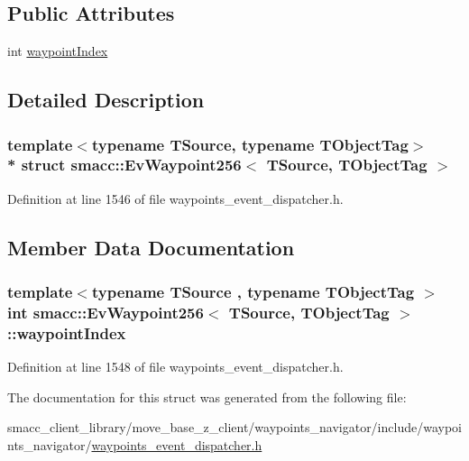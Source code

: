 \subsection*{Public Attributes}
\begin{DoxyCompactItemize}
\item 
int \hyperlink{structsmacc_1_1EvWaypoint256_a1b34ce939b7d125d504a2ea50d443607}{waypoint\+Index}
\end{DoxyCompactItemize}


\subsection{Detailed Description}
\subsubsection*{template$<$typename T\+Source, typename T\+Object\+Tag$>$\\*
struct smacc\+::\+Ev\+Waypoint256$<$ T\+Source, T\+Object\+Tag $>$}



Definition at line 1546 of file waypoints\+\_\+event\+\_\+dispatcher.\+h.



\subsection{Member Data Documentation}
\subsubsection[{\texorpdfstring{waypoint\+Index}{waypointIndex}}]{\setlength{\rightskip}{0pt plus 5cm}template$<$typename T\+Source , typename T\+Object\+Tag $>$ int {\bf smacc\+::\+Ev\+Waypoint256}$<$ T\+Source, T\+Object\+Tag $>$\+::waypoint\+Index}\hypertarget{structsmacc_1_1EvWaypoint256_a1b34ce939b7d125d504a2ea50d443607}{}\label{structsmacc_1_1EvWaypoint256_a1b34ce939b7d125d504a2ea50d443607}


Definition at line 1548 of file waypoints\+\_\+event\+\_\+dispatcher.\+h.



The documentation for this struct was generated from the following file\+:\begin{DoxyCompactItemize}
\item 
smacc\+\_\+client\+\_\+library/move\+\_\+base\+\_\+z\+\_\+client/waypoints\+\_\+navigator/include/waypoints\+\_\+navigator/\hyperlink{waypoints__event__dispatcher_8h}{waypoints\+\_\+event\+\_\+dispatcher.\+h}\end{DoxyCompactItemize}
